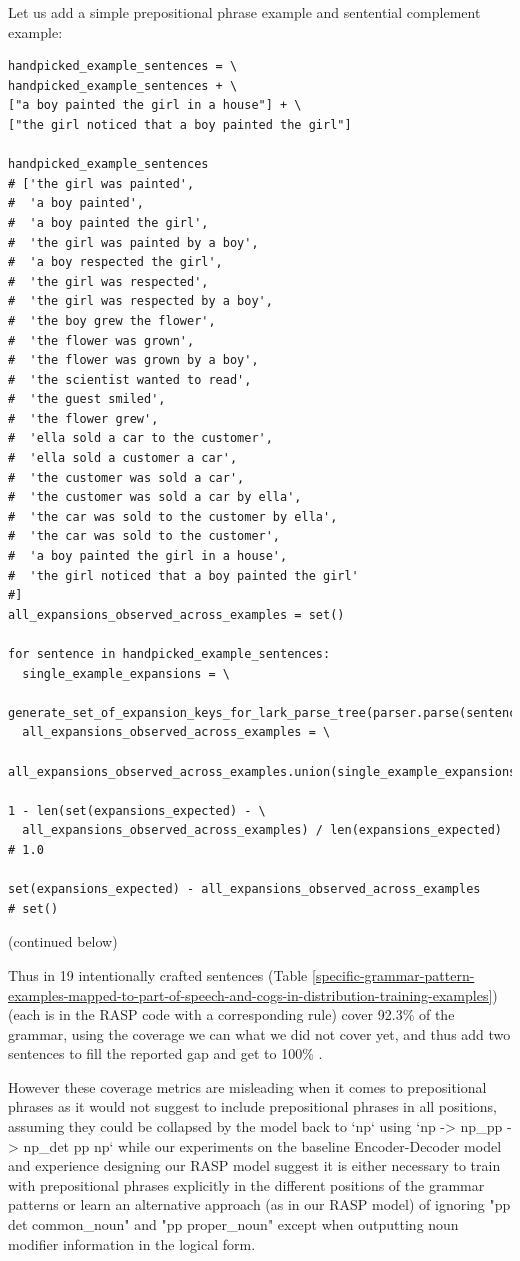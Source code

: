 \documentclass[11pt]{article}
\begin{document}
Let us add a simple prepositional phrase example and sentential complement example:
\begin{tiny}
\begin{verbatim}
handpicked_example_sentences = \
handpicked_example_sentences + \
["a boy painted the girl in a house"] + \
["the girl noticed that a boy painted the girl"]

handpicked_example_sentences
# ['the girl was painted',
#  'a boy painted',
#  'a boy painted the girl',
#  'the girl was painted by a boy',
#  'a boy respected the girl',
#  'the girl was respected',
#  'the girl was respected by a boy',
#  'the boy grew the flower',
#  'the flower was grown',
#  'the flower was grown by a boy',
#  'the scientist wanted to read',
#  'the guest smiled',
#  'the flower grew',
#  'ella sold a car to the customer',
#  'ella sold a customer a car',
#  'the customer was sold a car',
#  'the customer was sold a car by ella',
#  'the car was sold to the customer by ella',
#  'the car was sold to the customer',
#  'a boy painted the girl in a house',
#  'the girl noticed that a boy painted the girl'
#]
all_expansions_observed_across_examples = set()

for sentence in handpicked_example_sentences:
  single_example_expansions = \
    generate_set_of_expansion_keys_for_lark_parse_tree(parser.parse(sentence.lower()))
  all_expansions_observed_across_examples = \
    all_expansions_observed_across_examples.union(single_example_expansions)

1 - len(set(expansions_expected) - \
  all_expansions_observed_across_examples) / len(expansions_expected)
# 1.0

set(expansions_expected) - all_expansions_observed_across_examples
# set()
\end{verbatim}
\end{tiny}
(continued below)
\clearpage

Thus in 19 intentionally crafted sentences (Table \ref{specific-grammar-pattern-examples-mapped-to-part-of-speech-and-cogs-in-distribution-training-examples}) (each is in the RASP code with a corresponding rule) cover 92.3\% of the grammar, 
using the coverage we can what we did not cover yet, and thus add two sentences to fill the reported gap and get to 100\% .

However these coverage metrics are misleading when it comes to prepositional phrases as it would not suggest to include prepositional phrases in all positions, assuming they could be collapsed by the model back to `np` using `np -> np\_pp -> np\_det pp np` while our experiments on the \citep{Wu2023} baseline Encoder-Decoder model and experience designing our RASP model suggest it is either necessary to train with prepositional phrases explicitly in the different positions of the grammar patterns or learn an alternative approach (as in our RASP model) of ignoring "pp det common\_noun" and "pp proper\_noun" except when outputting noun modifier information in the logical form.
\end{document}
